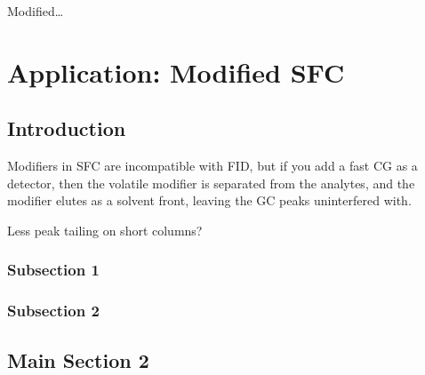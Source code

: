 
\begin{savequote}[45mm]
Modified\ldots
{}
\end{savequote}

\chapter{Application: Modified SFC} %

\label{Chapter7} %


\section{Introduction}

Modifiers in SFC are incompatible with FID, but if you add a fast CG as a
detector, then the volatile modifier is separated from the analytes, and the
modifier elutes as a solvent front, leaving the GC peaks uninterfered with.

Less peak tailing on short columns?

\subsection{Subsection 1}



\subsection{Subsection 2}


\section{Main Section 2}
